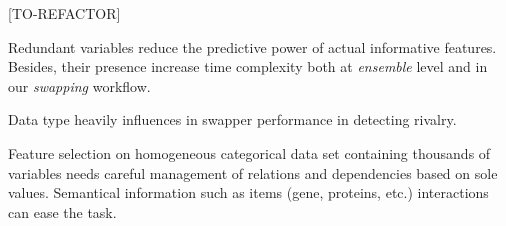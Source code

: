 [TO-REFACTOR]

Redundant variables reduce the predictive power of actual informative features. Besides, their presence increase time complexity both at \emph{ensemble} level and in our \emph{swapping} workflow.

Data type heavily influences in swapper performance in detecting rivalry.

Feature selection on homogeneous categorical data set containing thousands of variables needs careful management of relations and dependencies based on sole values. Semantical information such as items (gene, proteins, etc.) interactions can ease the task.